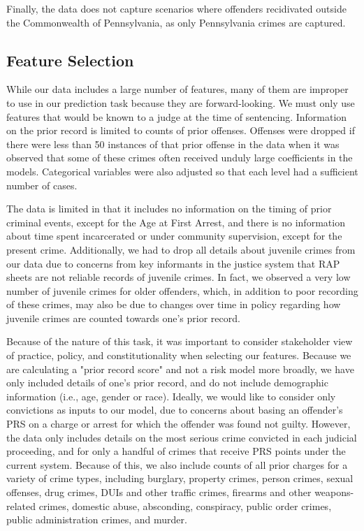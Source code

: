 \documentclass{article}
\begin{document}
Finally, the data does not capture scenarios where offenders recidivated outside the Commonwealth of Pennsylvania, as only Pennsylvania crimes are captured.

\subsection{Feature Selection}

While our data includes a large number of features, many of them are improper to use in our prediction task because they are forward-looking. We must only use features that would be known to a judge at the time of sentencing. Information on the prior record is limited to counts of prior offenses. Offenses were dropped if there were less than 50 instances of that prior offense in the data when it was observed that some of these crimes often received unduly large coefficients in the models. Categorical variables were also adjusted so that each level had a sufficient number of cases. 

The data is limited in that it includes no information on the timing of prior criminal events, except for the Age at First Arrest, and there is no information about time spent incarcerated or under community supervision, except for the present crime. Additionally, we had to drop all details about juvenile crimes from our data due to concerns from key informants in the justice system that RAP sheets are not reliable records of juvenile crimes. In fact, we observed a very low number of juvenile crimes for older offenders, which, in addition to poor recording of these crimes, may also be due to changes over time in policy regarding how juvenile crimes are counted towards one's prior record. 

Because of the nature of this task, it was important to consider stakeholder view of practice, policy, and constitutionality when selecting our features. Because we are calculating a "prior record score" and not a risk model more broadly, we have only included details of one's prior record, and do not include demographic information (i.e., age, gender or race). Ideally, we would like to consider only convictions as inputs to our model, due to concerns about basing an offender's PRS on a charge or arrest for which the offender was found not guilty. However, the data only includes details on the most serious crime convicted in each judicial proceeding, and for only a handful of crimes that receive PRS points under the current system. Because of this, we also include counts of all prior charges for a variety of crime types, including burglary, property crimes, person crimes, sexual offenses, drug crimes, DUIs and other traffic crimes, firearms and other weapons-related crimes, domestic abuse, absconding, conspiracy, public order crimes, public administration crimes, and murder. 
\end{document}
